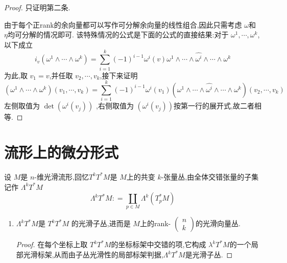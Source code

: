 \documentclass[../../几何与拓扑.tex]{subfiles}
\begin{document}
\begin{proof}
    只证明第二条.

    由于每个正rank的余向量都可以写作可分解余向量的线性组合,因此只需考虑 $  \omega  $和 $ \eta  $均可分解的情况即可.
    该特殊情况的公式是下面的公式的直接结果:对于 $  \omega ^{1},\cdots , \omega ^{k} $,以下成立 $$
    i_{v}\left(  \omega ^{1}\wedge \cdots \wedge  \omega ^{k} \right) = \sum _{i=1 }^{k}\left( -1 \right)^{i-1} \omega ^{i} \left( v \right) \omega ^{1}\wedge \cdots \wedge  \hat{ \omega ^{i}}  \wedge \cdots \wedge  \omega ^{k}
    $$ 为此,取 $ v_1=v $,并任取 $ v_2,\cdots ,v_{k} $,接下来证明 $$
    \left(  \omega ^{1}\wedge \cdots \wedge  \omega ^{k} \right)\left( v_1,\cdots ,v_{k} \right) = \sum _{i=1}^{k}\left( -1 \right)^{i-1}    \omega ^{i}\left( v_1 \right)\left(  \omega ^{1}\wedge \cdots \wedge \hat{ \omega ^{i}} \wedge \cdots \wedge  \omega ^{k} \right) \left( v_2,\cdots ,v_{k} \right)  
    $$左侧取值为 $ \det \left(  \omega ^{i}\left( v_{j} \right)  \right)  $ ,右侧取值为 $ \left(  \omega ^{i}\left( v_{j} \right)  \right)  $按第一行的展开式,故二者相等. 
\end{proof}

\section{流形上的微分形式}
\begin{definition}
    设 $ M $是 $ n $-维光滑流形,回忆$ T^{k}T^{*}M  $是 $ M $上的共变 $ k $-张量丛,由全体交错张量的子集记作 $  \Lambda ^{k}T^{*}M  $ $$
     \Lambda ^{k}T^{*}M : =  \coprod _{p \in M}  \Lambda ^{k}\left( T_{p}^{*}M \right) 
    $$   
\end{definition}

\begin{remark}
   \begin{enumerate}
    \item   $  \Lambda ^{k}T^{*}M $是 $ T^{k}T^{*}M $ 的光滑子丛,进而是 $ M $上的rank- $ \begin{pmatrix} 
        n\\ 
         k 
    \end{pmatrix}  $的光滑向量丛.     
    \begin{proof}
        在每个坐标上取 $ T^{k} T^{*}M $的坐标标架中交错的项,它构成 $  \lambda ^{k}T^{*}M $的一个局部光滑标架,从而由子丛光滑性的局部标架判据,$  \Lambda ^{k}T^{*}M $是光滑子丛.  
    \end{proof}
   \end{enumerate}
  
\end{remark}
\end{document}
